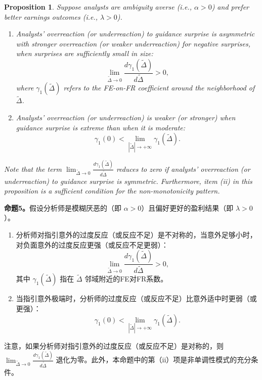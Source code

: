 \documentclass[12pt,a4paper]{article}
\newenvironment{translation}
  {\par\noindent{\color{transblue}\ignorespaces}}
  {\par\bigskip}
\newtheorem{proposition}[theorem]{Proposition}
\begin{document}
\begin{proposition}
Suppose analysts are ambiguity averse (i.e., $\alpha > 0$) and prefer better earnings outcomes (i.e., $\lambda > 0$).
\begin{enumerate}[label=(\roman*)]
\item Analysts' overreaction (or underreaction) to guidance surprise is asymmetric with stronger overreaction (or weaker underreaction) for negative surprises, when surprises are sufficiently small in size:
\[
\lim_{\tilde{\Delta} \to 0} \frac{d \gamma_1(\tilde{\Delta})}{d \tilde{\Delta}} > 0,
\]
where $\gamma_1(\tilde{\Delta})$ refers to the FE-on-FR coefficient around the neighborhood of $\tilde{\Delta}$.
\item Analysts' overreaction (or underreaction) is weaker (or stronger) when guidance surprise is extreme than when it is moderate:
\[
\gamma_1(0) < \lim_{|\tilde{\Delta}| \to +\infty} \gamma_1(\tilde{\Delta}).
\]
\end{enumerate}
Note that the term $\lim_{\tilde{\Delta} \to 0} \frac{d \gamma_1(\tilde{\Delta})}{d \tilde{\Delta}}$ reduces to zero if analysts' overreaction (or underreaction) to guidance surprise is symmetric. Furthermore, item (ii) in this proposition is a sufficient condition for the non-monotonicity pattern.
\end{proposition}
\begin{translation}
\textbf{命题5。}假设分析师是模糊厌恶的（即 $\alpha > 0$）且偏好更好的盈利结果（即 $\lambda > 0$）。
\begin{enumerate}[label=(\roman*)]
\item 分析师对指引意外的过度反应（或反应不足）是不对称的，当意外足够小时，对负面意外的过度反应更强（或反应不足更弱）：
\[
\lim_{\tilde{\Delta} \to 0} \frac{d \gamma_1(\tilde{\Delta})}{d \tilde{\Delta}} > 0,
\]
其中 $\gamma_1(\tilde{\Delta})$ 指在 $\tilde{\Delta}$ 邻域附近的FE对FR系数。
\item 当指引意外极端时，分析师的过度反应（或反应不足）比意外适中时更弱（或更强）：
\[
\gamma_1(0) < \lim_{|\tilde{\Delta}| \to +\infty} \gamma_1(\tilde{\Delta}).
\]
\end{enumerate}
注意，如果分析师对指引意外的过度反应（或反应不足）是对称的，则 $\lim_{\tilde{\Delta} \to 0} \frac{d \gamma_1(\tilde{\Delta})}{d \tilde{\Delta}}$ 退化为零。此外，本命题中的第（ii）项是非单调性模式的充分条件。
\end{translation}

\newpage
\end{document}
